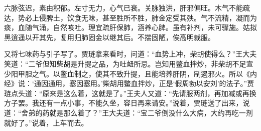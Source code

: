 \begin{qute2sp}
    六脉弦迟，素由积郁。左寸无力，心气已衰。关脉独洪，肝邪偏旺。木气不能疏达，势必上侵脾土，饮食无味，甚至胜所不胜，肺金定受其殃。气不流精，凝而为痰，血随气涌，自然咳吐。理宜疏肝保肺，涵养心脾。虽有补剂，未可骤施。姑拟黑逍遥以开其先，复用归肺固金以继其后。不揣固陋，俟高明裁服。
\end{qute2sp}


\begin{parag}
    又将七味药与引子写了。贾琏拿来看时，问道：“血势上冲，柴胡使得么？”王大夫笑道：“二爷但知柴胡是升提之品，为吐衄所忌。岂知用鳖血拌炒，非柴胡不足宣少阳甲胆之气。以鳖血制之，使其不致升提，且能培养肝阴，制遏邪火。所以《内经》说：‘通因通用，塞因塞用。’柴胡用鳖血拌炒，正是‘假周勃以安刘’的法子。”贾琏点头道：“原来是这么着，这就是了。”王夫人又道：“先请服两剂，再加减或再换方子罢。我还有一点小事，不能久坐，容日再来请安。”说着，贾琏送了出来，说道：“舍弟的药就是那么着了？”王大夫道：“宝二爷倒没什么大病，大约再吃一剂就好了。”说着，上车而去。
\end{parag}


